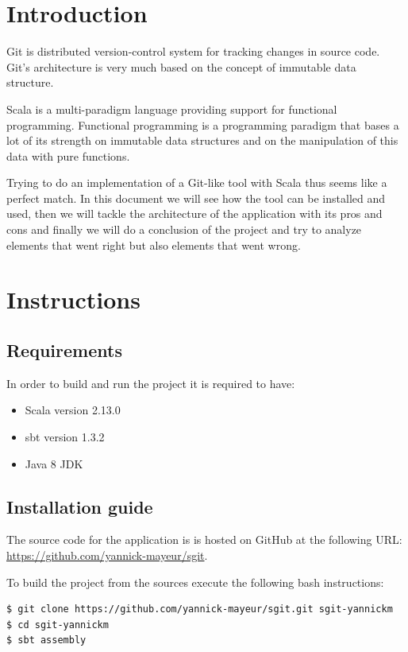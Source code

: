 \documentclass[12pt,a4paper]{scrartcl}
\begin{document}

\tableofcontents
\break


\section{Introduction}

Git is distributed version-control system for tracking changes in source code.
Git's architecture is very much based on the concept of immutable
data structure.

Scala is a multi-paradigm language providing support for functional
programming. Functional programming is a programming paradigm that bases a lot
of its strength on immutable data structures and on the manipulation  of this
data with pure functions.

Trying to do an implementation of a Git-like tool with Scala thus seems like a
perfect match. In this document we will see how the tool can be installed and
used, then we will tackle the architecture of the application with its pros and
cons and finally we will do a conclusion of the project and try to analyze
elements that went right but also elements that went wrong.

\section{Instructions}

\subsection{Requirements}

In order to build and run the project it is required to have:

\begin{itemize}
		\item Scala version 2.13.0
		\item sbt version 1.3.2
		\item Java 8 JDK
\end{itemize}

\subsection{Installation guide}
The source code for the application is is hosted on GitHub at the following
URL: \url{https://github.com/yannick-mayeur/sgit}.

To build the project from the sources execute the following bash instructions:

\begin{lstlisting}
$ git clone https://github.com/yannick-mayeur/sgit.git sgit-yannickm
$ cd sgit-yannickm
$ sbt assembly
\end{lstlisting}
\end{document}
